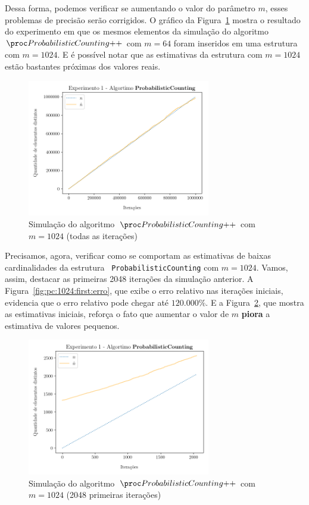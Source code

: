 Dessa forma, podemos verificar se aumentando o valor do parâmetro $m$, esses problemas de precisão serão corrigidos. O 
gráfico da Figura~\ref{fig:pc:1024:full} mostra o resultado do experimento em que os mesmos elementos da simulação do 
algoritmo~$\pcpp$ com $m = 64$ foram inseridos em uma estrutura com $m = 1024$. E é possível notar que as estimativas da 
estrutura com $m = 1024$ estão bastantes próximas dos valores reais.

\begin{figure}[h]
  \centering
  \includegraphics[height=6cm, width=\textwidth]{figuras/probabilistic_counting_full_1024.png}
	\caption{Simulação do algoritmo~$\pcpp$ com $m = 1024$ (todas as iterações)}
  \label{fig:pc:1024:full}
\end{figure}

\newpage
Precisamos, agora, verificar como se comportam as estimativas de baixas cardinalidades da estrutura
~\texttt{ProbabilisticCounting} com $m = 1024$. Vamos, assim, destacar as primeiras 2048 iterações da simulação 
anterior. A Figura~\ref{fig:pc:1024:first:erro}, que exibe o erro relativo nas iterações iniciais, evidencia que o erro
relativo pode chegar até $120.000\%$. E a Figura~\ref{fig:pc:1024:first}, que mostra as estimativas iniciais, reforça o 
fato que aumentar o valor de $m$ \textbf{piora} a estimativa de valores pequenos.

\begin{figure}[h]
  \centering
  \includegraphics[height=6cm, width=\textwidth]{figuras/probabilistic_counting_first_1024.png}
	\caption{Simulação do algoritmo~$\pcpp$ com $m = 1024$ (2048 primeiras iterações)}
  \label{fig:pc:1024:first}
\end{figure}

